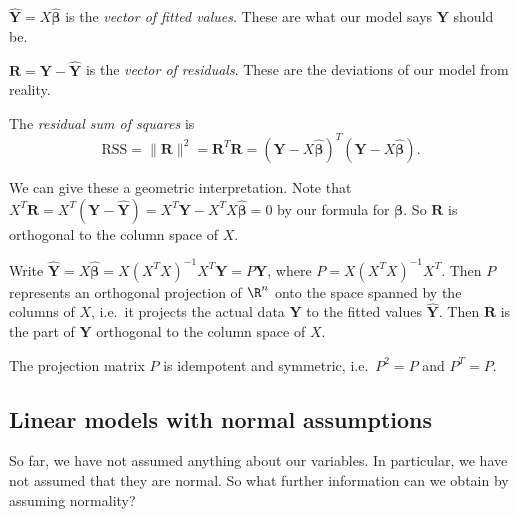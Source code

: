 \documentclass[a4paper]{article}
\begin{document}
\begin{defi}
  $\hat{\mathbf{Y}} = X\hat{\boldsymbol\beta}$ is the \emph{vector of fitted values}. These are what our model says $\mathbf{Y}$ should be.

  $\mathbf{R} = \mathbf{Y} - \hat{\mathbf{Y}}$ is the \emph{vector of residuals}. These are the deviations of our model from reality.

  The \emph{residual sum of squares} is
  \[
    \mathrm{RSS} = \|\mathbf{R}\|^2 = \mathbf{R}^T\mathbf{R} = (\mathbf{Y} - X\hat{\boldsymbol\beta})^T(\mathbf{Y} - X\hat{\boldsymbol\beta}).
  \]
\end{defi}
We can give these a geometric interpretation. Note that $X^T\mathbf{R} = X^T(\mathbf{Y} - \hat{\mathbf{Y}}) = X^T\mathbf{Y} - X^TX\hat{\boldsymbol\beta} = 0$ by our formula for $\boldsymbol\beta$. So $\mathbf{R}$ is orthogonal to the column space of $X$.

Write $\hat{\mathbf{Y}} = X\hat{\boldsymbol\beta} = X(X^TX)^{-1}X^T\mathbf{Y} = P\mathbf{Y}$, where $P = X(X^TX)^{-1}X^T$. Then $P$ represents an orthogonal projection of $\R^n$ onto the space spanned by the columns of $X$, i.e.\ it projects the actual data $\mathbf{Y}$ to the fitted values $\hat{\mathbf{Y}}$. Then $\mathbf{R}$ is the part of $\mathbf{Y}$ orthogonal to the column space of $X$.

The projection matrix $P$ is idempotent and symmetric, i.e.\ $P^2 = P$ and $P^T = P$.
\subsection{Linear models with normal assumptions}
So far, we have not assumed anything about our variables. In particular, we have not assumed that they are normal. So what further information can we obtain by assuming normality?
\end{document}

